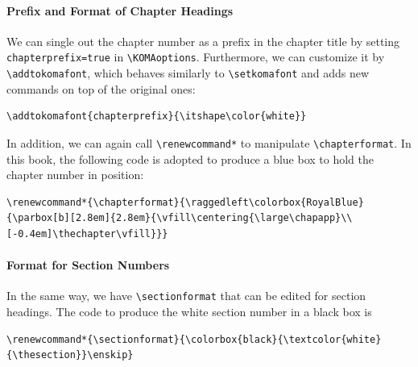 \paragraph{Prefix and Format of Chapter Headings}
We can single out the chapter number as a prefix in the chapter title by setting \texttt{chapterprefix=true} in \texttt{\textbackslash KOMAoptions}. Furthermore, we can customize it by \texttt{\textbackslash addtokomafont}, which behaves similarly to \texttt{\textbackslash setkomafont} and adds new commands on top of the original ones:
\begin{lstlisting}
\addtokomafont{chapterprefix}{\itshape\color{white}}
\end{lstlisting}
In addition, we can again call \texttt{\textbackslash renewcommand*} to manipulate \texttt{\textbackslash chapterformat}. In this book, the following code is adopted to produce a blue box to hold the chapter number in position:
\begin{lstlisting}
\renewcommand*{\chapterformat}{\raggedleft\colorbox{RoyalBlue}{\parbox[b][2.8em]{2.8em}{\vfill\centering{\large\chapapp}\\[-0.4em]\thechapter\vfill}}}  
\end{lstlisting}

\paragraph{Format for Section Numbers}
In the same way, we have \texttt{\textbackslash sectionformat} that can be edited for section headings. The code to produce the white section number in a black box is
\begin{lstlisting}
\renewcommand*{\sectionformat}{\colorbox{black}{\textcolor{white}{\thesection}}\enskip}
\end{lstlisting}

